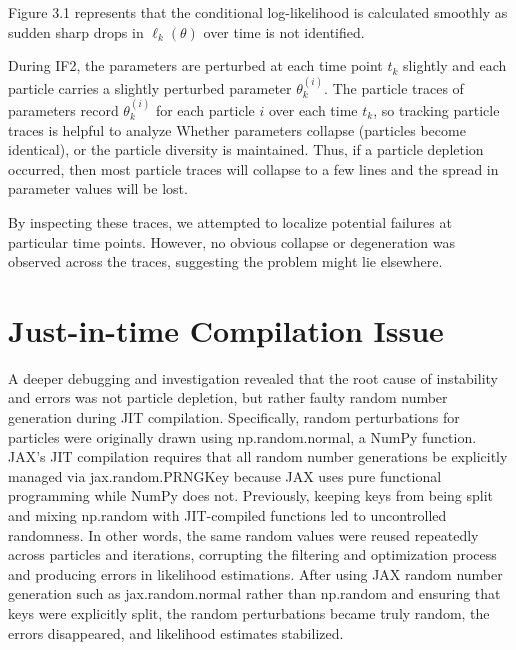 \documentclass[11pt]{report}
\begin{document}
\newpage
Figure 3.1 represents that the conditional log-likelihood is calculated smoothly as sudden sharp drops in $\ell_k(\theta)$ over time is not identified.


During IF2, the parameters are perturbed at each time point $t_k$ slightly and each particle carries a slightly perturbed parameter $\theta_k^{(i)}$. The particle traces of parameters record $\theta_k^{(i)}$ for each particle $i$ over each time $t_k$, so tracking particle traces is helpful to analyze Whether parameters collapse (particles become identical), or the particle diversity is maintained. Thus, if a particle depletion occurred, then most particle traces will collapse to a few lines and the spread in parameter values will be lost.


By inspecting these traces, we attempted to localize potential failures at particular time points. However, no obvious collapse or degeneration was observed across the traces, suggesting the problem might lie elsewhere.

\section{Just-in-time Compilation Issue}
A deeper debugging and investigation revealed that the root cause of instability and errors was not particle depletion, but rather faulty random number generation during JIT compilation. Specifically, random perturbations for particles were originally drawn using np.random.normal, a NumPy function. JAX's JIT compilation requires that all random number generations be explicitly managed via jax.random.PRNGKey because JAX uses pure functional programming while NumPy does not. Previously, keeping keys from being split and mixing np.random with JIT-compiled functions led to uncontrolled randomness. In other words, the same random values were reused repeatedly across particles and iterations, corrupting the filtering and optimization process and producing errors in likelihood estimations. After using JAX random number generation such as jax.random.normal rather than np.random and ensuring that keys were explicitly split, the random perturbations became truly random, the errors disappeared, and likelihood estimates stabilized.
\end{document}
